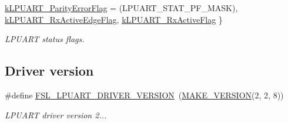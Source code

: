 \begin{DoxyCompactItemize}
$$\mbox{\hyperlink{group__lpuart__driver_gga24bb7ca3f894fe5ff55b9f38bec16c89a2f8d4c03df61bc4678b2ccf1c69eedeb}{k\+L\+P\+U\+A\+R\+T\+\_\+\+Parity\+Error\+Flag}} = (L\+P\+U\+A\+R\+T\+\_\+\+S\+T\+A\+T\+\_\+\+P\+F\+\_\+\+M\+A\+SK), 
\newline
\mbox{\hyperlink{group__lpuart__driver_gga24bb7ca3f894fe5ff55b9f38bec16c89ae89f181d8dbbf5254d6fe843e4cac6d6}{k\+L\+P\+U\+A\+R\+T\+\_\+\+Rx\+Active\+Edge\+Flag}}, 
\mbox{\hyperlink{group__lpuart__driver_gga24bb7ca3f894fe5ff55b9f38bec16c89a1f14711a74db1cc141b5c2627ee4c799}{k\+L\+P\+U\+A\+R\+T\+\_\+\+Rx\+Active\+Flag}}
 \}
\begin{DoxyCompactList}\small\item\em L\+P\+U\+A\+RT status flags. \end{DoxyCompactList}\end{DoxyCompactItemize}
\subsection*{Driver version}
\begin{DoxyCompactItemize}
\item 
\mbox{\label{group__lpuart__driver_ga0870fb824ece32739bd35f819f8c408e}} 
\#define \mbox{\hyperlink{group__lpuart__driver_ga0870fb824ece32739bd35f819f8c408e}{F\+S\+L\+\_\+\+L\+P\+U\+A\+R\+T\+\_\+\+D\+R\+I\+V\+E\+R\+\_\+\+V\+E\+R\+S\+I\+ON}}~(\mbox{\hyperlink{group__ftfx__utilities_ga812138aa3315b0c6953c1a26130bcc37}{M\+A\+K\+E\+\_\+\+V\+E\+R\+S\+I\+ON}}(2, 2, 8))
\begin{DoxyCompactList}\small\item\em L\+P\+U\+A\+RT driver version 2... \end{DoxyCompactList}\end{DoxyCompactItemize}

